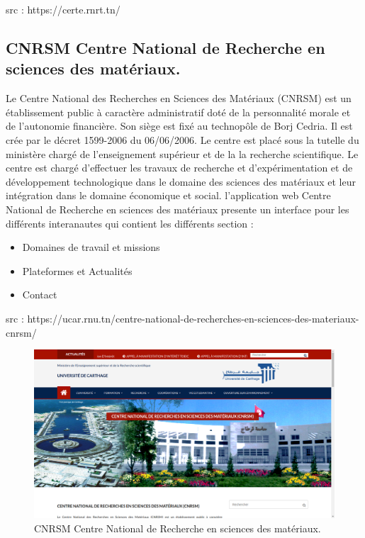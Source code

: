 \documentclass{book}
\begin{document}
src : https://certe.rnrt.tn/
\newpage
\subsection*{CNRSM Centre National de Recherche en sciences des matériaux.}
Le Centre National des Recherches en Sciences des Matériaux (CNRSM) est un établissement public à caractère administratif doté de la personnalité morale et de l’autonomie financière.
Son siège est fixé au technopôle de Borj Cedria. Il est crée par le décret 1599-2006 du 06/06/2006.
Le centre est placé sous la tutelle du ministère chargé de l’enseignement supérieur et de la la recherche scientifique.
Le centre est chargé d’effectuer les travaux de recherche et d’expérimentation et de développement technologique dans le domaine des sciences des matériaux et leur intégration dans le domaine économique et social.
l'application web Centre National de Recherche en sciences des matériaux presente un interface pour les différents interanautes qui contient les différents section : 
\begin{itemize}
\item Domaines de travail et missions
\item Plateformes et Actualités 
\item Contact
\end{itemize}

src : https://ucar.rnu.tn/centre-national-de-recherches-en-sciences-des-materiaux-cnrsm/
\begin{figure}[h]
    \centering
    \includegraphics[width=1\textwidth]{3.png}
    \caption{CNRSM Centre National de Recherche en sciences des matériaux.}
    \label{fig:mesh1}
\end{figure}
\end{document}
